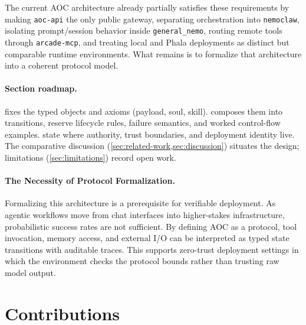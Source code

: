 \documentclass[11pt]{article}
\theoremstyle{remark}
\newcommand{\AOC}{\textup{\textsc{AOC}}}
\begin{document}
The current \AOC{} architecture already partially satisfies these requirements by making \texttt{aoc-api} the only public gateway, separating orchestration into \texttt{nemoclaw}, isolating prompt/session behavior inside \texttt{general\_nemo}, routing remote tools through \texttt{arcade-mcp}, and treating local and Phala deployments as distinct but comparable runtime environments. What remains is to formalize that architecture into a coherent protocol model.

\paragraph{Section roadmap.}
 fixes the typed objects and axioms (payload, soul, skill).  composes them into transitions, reserve lifecycle rules, failure semantics, and worked control-flow examples.  state where authority, trust boundaries, and deployment identity live. The comparative discussion (\cref{sec:related-work,sec:discussion}) situates the design; limitations (\cref{sec:limitations}) record open work.

\paragraph{The Necessity of Protocol Formalization.}
Formalizing this architecture is a prerequisite for verifiable deployment. As agentic workflows move from chat interfaces into higher-stakes infrastructure, probabilistic success rates are not sufficient. By defining \AOC{} as a protocol, tool invocation, memory access, and external I/O can be interpreted as typed state transitions with auditable traces. This supports zero-trust deployment settings in which the environment checks the protocol bounds rather than trusting raw model output.

\section*{Contributions}
\end{document}
